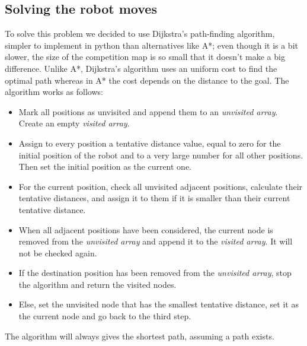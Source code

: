 \documentclass[a4paper,12pt]{article}
\begin{document}
\subsection{Solving the robot moves}

To solve this problem we decided to use Dijkstra's path-finding algorithm, simpler to implement in python than alternatives like A*; even though it is a bit slower, the size of the competition map is so small that it doesn't make a big difference. Unlike A*, Dijkstra's algorithm uses an uniform cost to find the optimal path whereas in A* the cost depends on the distance to the goal.
The algorithm works as follows:
\begin{itemize}
    \item Mark all positions as unvisited and append them to an \textit{unvisited array}. Create an empty \textit{visited array}.
    \item Assign to every position a tentative distance value, equal to zero for the initial position of the robot and to a very large number for all other positions. Then set the initial position as the current one.
    \item For the current position, check all unvisited adjacent positions, calculate their tentative distances, and assign it to them if it is smaller than their current tentative distance.
    \item When all adjacent positions have been considered, the current node is removed from the \textit{unvisited array} and append it to the  \textit{visited array}. It will not be checked again.
    \item If the destination position has been removed from the \textit{unvisited array}, stop the algorithm and return the visited nodes.
    \item Else, set the unvisited node that has the smallest tentative distance, set it as the current node and go back to the third step.
\end{itemize}

The algorithm will always gives the shortest path, assuming a path exists.
\end{document}
